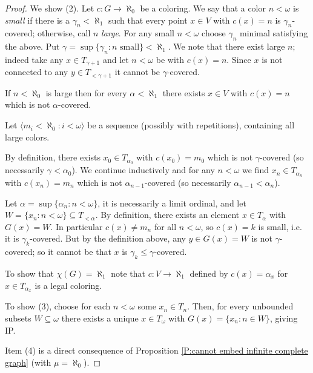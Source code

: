 \documentclass[a4paper]{amsart}
\theoremstyle{plain}
\theoremstyle{definition}
\theoremstyle{remark}
\numberwithin{equation}{section}
\begin{document}
\begin{proof}
We show (2). Let $c:G\to \aleph_0$ be a coloring. We say that a color $n<\omega$ is \emph{small} if there is a $\gamma_n<\aleph_1$ such that every point $x\in V$ with $c(x)=n$ is $\gamma_n$-covered; otherwise, call $n$ \emph{large}. For any small $n<\omega$ choose $\gamma_n$ minimal satisfying the above. Put $\gamma=\sup\{\gamma_n : n\text{ small}\}<\aleph_1$. We note that there exist large $n$; indeed take any $x\in T_{\gamma+1}$ and let $n<\omega$ be with $c(x)=n$. Since $x$ is not connected to any $y\in T_{<\gamma+1}$ it cannot be $\gamma$-covered. 

If $n<\aleph_0$ is large then for every $\alpha<\aleph_1$ there exists $x\in V$ with $c(x)=n$ which is not $\alpha$-covered. 

Let $\langle m_i<\aleph_0 :i<\omega\rangle$ be a sequence (possibly with repetitions), containing all large colors.

By definition, there exists $x_0\in T_{\alpha_0}$ with $c(x_0)=m_0$ which is not $\gamma$-covered (so necessarily $\gamma<\alpha_0$). We continue inductively and for any $n<\omega$ we find $x_n\in T_{\alpha_n}$ with $c(x_n)=m_n$ which is not $\alpha_{n-1}$-covered (so necessarily $\alpha_{n-1}<\alpha_n$). 

Let $\alpha=\sup\{\alpha_n:n<\omega\}$, it is necessarily a limit ordinal, and let $W=\{x_n :n<\omega\}\subseteq T_{<\alpha}$. By definition, there exists an element $x\in T_\alpha$ with $G(x)=W$. In particular $c(x)\neq m_n$ for all $n<\omega$, so $c(x)=k$ is small, i.e. it is $\gamma_k$-covered. But by the definition above, any $y\in G(x)=W$ is not $\gamma$-covered; so it cannot be that $x$ is $\gamma_k\leq \gamma$-covered.

To show that $\chi(G)=\aleph_1$ note that $c:V\to \aleph_1$ defined by $c(x)=\alpha_x$ for $x\in T_{\alpha_x}$ is a legal coloring.



%
%

To show (3), choose for each $n<\omega$ some $x_n \in T_n$. Then, for every unbounded subsets $W\subseteq \omega$ there exists a unique $x\in T_\omega$ with $G(x)=\{x_n : n \in W\}$, giving IP.

Item (4) is a direct consequence of Proposition \ref{P:cannot embed infinite complete graph} (with $\mu=\aleph_0$).
\end{proof}
\end{document}
